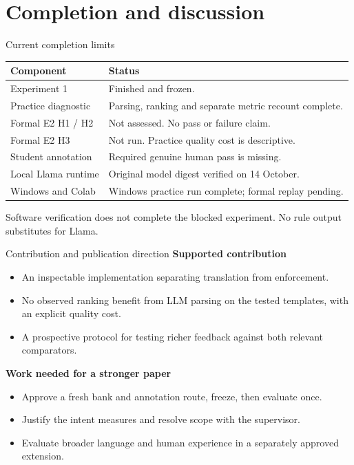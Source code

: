 \documentclass[10pt]{beamer}
\newcommand{\toprule}{\hline}
\newcommand{\midrule}{\hline}
\newcommand{\bottomrule}{\hline}
\newcommand{\src}[1]{\vfill{\tiny\color{bcitgray}#1}}
\begin{document}
\section{Completion and discussion}
\begin{frame}{Current completion limits}
\begin{tabular}{@{}P{3.3cm}P{6.7cm}@{}}
\toprule
Component & Status\\\midrule
Experiment 1 & Finished and frozen.\\[0.13cm]
Practice diagnostic & Parsing, ranking and separate metric recount complete.\\[0.13cm]
Formal E2 H1 / H2 & Not assessed. No pass or failure claim.\\[0.13cm]
Formal E2 H3 & Not run. Practice quality cost is descriptive.\\[0.13cm]
Student annotation & Required genuine human pass is missing.\\[0.13cm]
Local Llama runtime & Original model digest verified on 14 October.\\[0.13cm]
Windows and Colab & Windows practice run complete; formal replay pending.\\\bottomrule
\end{tabular}\par
\src{Software verification does not complete the blocked experiment. No rule output substitutes for Llama.}
\end{frame}

\begin{frame}{Contribution and publication direction}
\textbf{Supported contribution}
\begin{itemize}
\item An inspectable implementation separating translation from enforcement.
\item No observed ranking benefit from LLM parsing on the tested templates, with an explicit quality cost.
\item A prospective protocol for testing richer feedback against both relevant comparators.
\end{itemize}
\vspace{0.3cm}
\textbf{Work needed for a stronger paper}
\begin{itemize}
\item Approve a fresh bank and annotation route, freeze, then evaluate once.
\item Justify the intent measures and resolve scope with the supervisor.
\item Evaluate broader language and human experience in a separately approved extension.
\end{itemize}
\end{frame}
\end{document}

